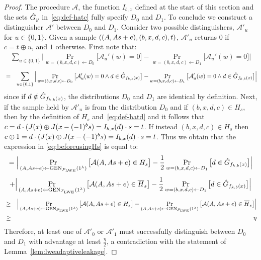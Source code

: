 \begin{proof}
The procedure $\mathcal{A}$, the function $I_{b,x}$ defined at the start of this section and the sets $\hat{G}_{y}$ in~\eqref{eq:def-hatc} fully specify ${D}_0$ and ${D}_1$. To conclude we construct a distinguisher $\mathcal{A}'$ between ${D}_0$ and ${D}_1$. Consider two possible distinguishers, $\mathcal{A}'_u$ for $u\in \{0,1\}$. Given a sample $((\*A,\*A\*s+\*e),(b,x,d,c),t)$, $\mathcal{A}'_u$ returns $0$ if $c=t\oplus u$, and $1$ otherwise. First note that:
\begin{eqnarray}
\sum_{u\in \{0,1\}} \Big|\Pr_{w=(b,x,d,c)\leftarrow {D}_0}\big[\mathcal{A}_u'(w)=0\big]-\Pr_{w=(b,x,d,c)\leftarrow {D}_1}\big[\mathcal{A}_u'(w)=0\big]\Big|
\end{eqnarray}
\begin{eqnarray}
&=& \sum_{u\in\{0,1\}}\Big|\Pr_{w=(b,x,d,c)\leftarrow {D}_0}\big[\mathcal{A}_u'(w)=0 \wedge d\in \hat{G}_{f_{k,b}(x)} \big]-\Pr_{w=(b,x,d,c)\leftarrow {D}_1}\big[\mathcal{A}_u'(w)=0 \wedge d\in \hat{G}_{f_{k,b}(x)}\big]\Big|\label{eq:beforeusingHs}
\end{eqnarray}
since if $d\notin \hat{G}_{f_{k,b}(x)}$, the distributions ${D}_0$ and ${D}_1$ are identical by definition. Next, if the sample held by $\mathcal{A}'_u$ is from the distribution ${D}_0$ and if $(b,x,d,c) \in H_s$, then by the definition of $H_s$ and~\eqref{eq:def-hatd} and it follows that $c = d\cdot(\inj(x)\oplus \inj( x - (-1)^b \*s )  = I_{b,x}(d)\cdot s = t$. If instead $(b,x,d,c)\in \overline{H}_s$ then $c\oplus 1 = d\cdot(\inj(x)\oplus \inj( x - (-1)^b \*s ) = I_{b,x}(d)\cdot s = t$.
Thus we obtain that the expression in \eqref{eq:beforeusingHs} is equal to: 
\begin{equation}
= \Big|\Pr_{(\*A,\*A\*s+\*e)\leftarrow \textrm{GEN}_{\mathcal{F}_{\lwe}}(1^{\lambda})}\big[\mathcal{A}(\*A,\*A\*s+\*e) \in H_s\big] -\frac{1}{2}\Pr_{w=(b,x,d,c)\leftarrow {D}_1}\big[ d\in \hat{\dset}_{f_{k,b}(x)}\big]\Big| 
\end{equation}
\begin{equation}
+ \Big|\Pr_{(\*A,\*A\*s+\*e)\leftarrow \textrm{GEN}_{\mathcal{F}_{\lwe}}(1^{\lambda})}\big[\mathcal{A}(\*A,\*A\*s+\*e) \in \overline{H}_s\big]-\frac{1}{2}\Pr_{w=(b,x,d,c)\leftarrow {D}_1}\big[ d\in \hat{\dset}_{f_{k,b}(x)}\big]\Big|\\
\end{equation}
\begin{eqnarray*}
&\geq& \Big|\Pr_{(\*A,\*A\*s+\*e)\leftarrow \textrm{GEN}_{\mathcal{F}_{\lwe}}(1^{\lambda})}\big[\mathcal{A}(\*A,\*A\*s+\*e) \in H_s\big] - \Pr_{(\*A,\*A\*s+\*e)\leftarrow \textrm{GEN}_{\mathcal{F}_{\lwe}}(1^{\lambda})}\big[\mathcal{A}(\*A,\*A\*s+\*e) \in \overline{H}_s\big]\Big| \\
&\geq& \eta
\end{eqnarray*} 
Therefore, at least one of $\mathcal{A}'_0$ or $\mathcal{A}'_1$ must successfully distinguish between ${D}_0$ and ${D}_1$ with advantage at least $\frac{\eta}{2}$, a contradiction with the statement of Lemma~\ref{lem:lweadaptiveleakage}. 
\end{proof}